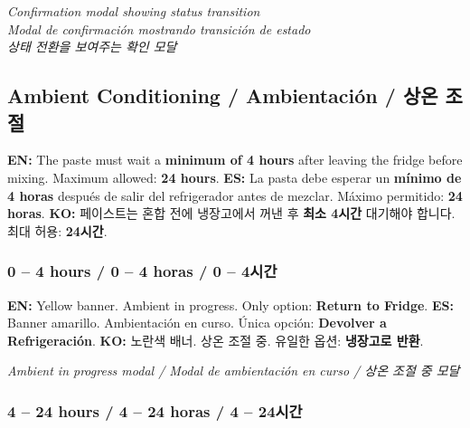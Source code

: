 \documentclass[12pt,a4paper]{article}
\newcommand{\tri}[3]{%
  \textbf{EN:} #1 \quad\textbar\quad \textbf{ES:} #2 \quad\textbar\quad \textbf{KO:} #3%
}
\begin{document}
\begin{photobox}
\centering
\vspace{3cm}
\textit{Confirmation modal showing status transition\\
Modal de confirmación mostrando transición de estado\\
상태 전환을 보여주는 확인 모달}
\vspace{0.5cm}
\end{photobox}

\subsection{Ambient Conditioning / Ambientación / 상온 조절}

\begin{warningbox}
\tri{The paste must wait a \textbf{minimum of 4 hours} after leaving the fridge before mixing. Maximum allowed: \textbf{24 hours}.}
{La pasta debe esperar un \textbf{mínimo de 4 horas} después de salir del refrigerador antes de mezclar. Máximo permitido: \textbf{24 horas}.}
{페이스트는 혼합 전에 냉장고에서 꺼낸 후 \textbf{최소 4시간} 대기해야 합니다. 최대 허용: \textbf{24시간}.}
\end{warningbox}

\subsubsection*{0 – 4 hours / 0 – 4 horas / 0 – 4시간}

\tri{Yellow banner. Ambient in progress. Only option: \textbf{Return to Fridge}.}
{Banner amarillo. Ambientación en curso. Única opción: \textbf{Devolver a Refrigeración}.}
{노란색 배너. 상온 조절 중. 유일한 옵션: \textbf{냉장고로 반환}.}

\begin{photobox}
\centering
\vspace{3.5cm}
\textit{Ambient in progress modal / Modal de ambientación en curso / 상온 조절 중 모달}
\vspace{0.5cm}
\end{photobox}

\subsubsection*{4 – 24 hours / 4 – 24 horas / 4 – 24시간}
\end{document}
